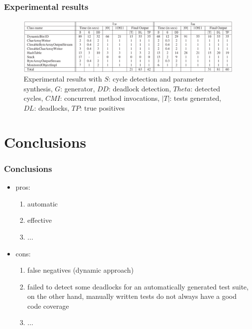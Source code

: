 \documentclass{beamer}
\begin{document}
\begin{frame}
\frametitle{Experimental results}
\begin{figure}[ht!]
    \includegraphics[scale = 0.3]{Images/er2}
    \caption{%
        Experimental results with $S$: cycle detection and parameter synthesis, $G$: generator, $DD$: deadlock detection, $Theta$: detected cycles,
        $CMI$: concurrent method invocations, $|T|$: tests generated, $DL$: deadlocks, $TP$: true positives
     }%
\end{figure}
\end{frame}

\section{Conclusions}
\begin{frame}
\frametitle{Conclusions}

    \begin{itemize}
    \item pros:
    \begin{enumerate}
      \item automatic
      \item effective
      \item ...
    \end{enumerate}
    \item cons:
    \begin{enumerate}
      \item false negatives (dynamic approach)
      \item failed to detect some deadlocks for an automatically generated test suite, on the other hand, manually written tests do not always have a good code coverage
      \item ...
    \end{enumerate}
    \end{itemize}

\end{frame}



\end{document}
